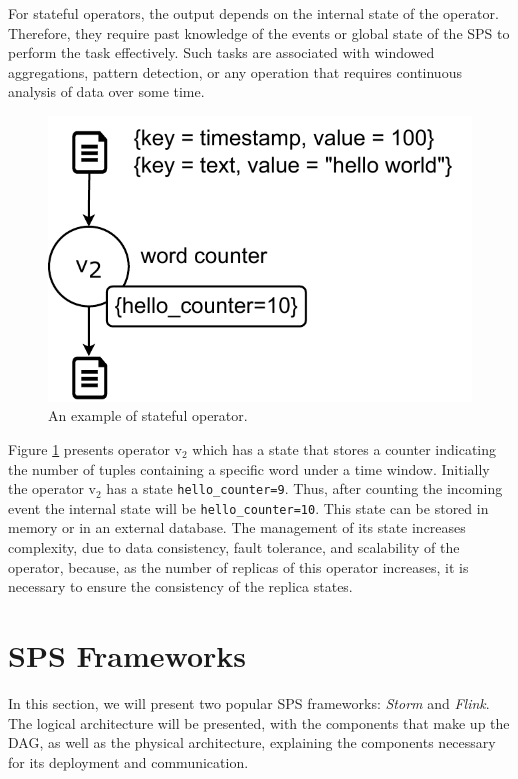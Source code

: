 For stateful operators, the output depends on the internal state of the operator.  Therefore, they require past knowledge of the events or global state of the SPS to perform the task effectively. Such tasks are associated with windowed aggregations, pattern detection, or any operation that requires continuous analysis of data over some time.

\begin{figure}[ht!]
  \centering
   \includegraphics[scale=0.6]{figures/concepts/SPS-Stateful-Operator.pdf}
  \caption{An example of stateful operator.}
  \label{fig:sps-stateful-operator}
\end{figure}

Figure \ref{fig:sps-stateful-operator} presents operator $\text{v}_2$ which has a state that stores a counter indicating the number of tuples containing a specific word under a time window. Initially the operator $\text{v}_2$ has a state \texttt{hello\_counter=9}. Thus, after counting the incoming event the internal state will be \texttt{hello\_counter=10}. This state can be stored in memory or in an external database. The management of its state increases complexity, due to data consistency, fault tolerance, and scalability of the operator, because, as the number of replicas of this operator increases, it is necessary to ensure the consistency of the replica states.

\section{SPS Frameworks}
\label{sps-frameworks}
In this section, we will present two popular SPS frameworks: \textit{Storm} and \textit{Flink}. The logical architecture will be presented, with the components that make up the DAG, as well as the physical architecture, explaining the components necessary for its deployment and communication.


